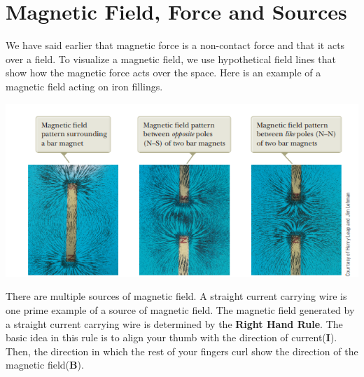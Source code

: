 \documentclass[9pt]{article}
\begin{document}
	\section*{Magnetic Field, Force and Sources}
	We have said earlier that magnetic force is a non-contact force and that it acts over a field. To visualize a magnetic field, we use hypothetical field lines that show how the magnetic force acts over the space. Here is an example of a magnetic field acting on iron fillings. \\
	\begin{center}
	\includegraphics[scale=0.5]{magnetic_field_patterns.png}	
	\end{center}
	There are multiple sources of magnetic field. A straight current carrying wire is one prime example of a source of magnetic field. The magnetic field generated by a straight current carrying wire is determined by the \textbf{Right Hand Rule}. The basic idea in this rule is to align your thumb with the direction of current(\textbf{I}). Then, the direction in which the rest of your fingers curl show the direction of the magnetic field(\textbf{B}).
\end{document}
